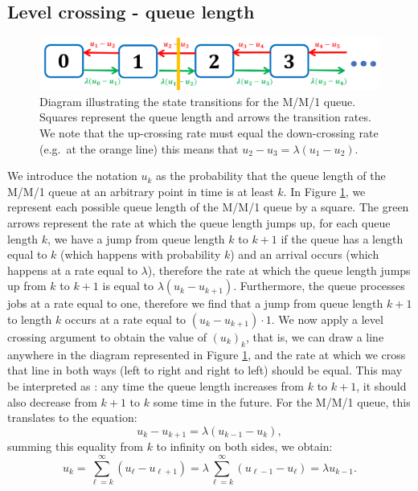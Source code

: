 \documentclass[12pt]{report}
\begin{document}
\begin{appendices}
\section{Level crossing - queue length} \label{sec:MM1_level_cross_QL}
\begin{figure}
\begin{center}
\includegraphics[scale=0.5]{figures/Appendix/MM1_diagram.PNG}
\end{center}
\caption{Diagram illustrating the state transitions for the M/M/1 queue. Squares represent the queue length and arrows the transition rates. We note that the up-crossing rate must equal the down-crossing rate (e.g.~at the orange line) this means that $u_2 - u_3 = \lambda (u_1 - u_2)$.}\label{fig:MM1_diagram}
\end{figure}
We introduce the notation $u_k$ as the probability that the queue length of the M/M/1 queue at an arbitrary point in time is at least $k$. In Figure \ref{fig:MM1_diagram}, we represent each possible queue length of the M/M/1 queue by a square. The green arrows represent the rate at which the queue length jumps up, for each queue length $k$, we have a jump from queue length $k$ to $k+1$ if the queue has a length equal to $k$ (which happens with probability $k$) and an arrival occurs (which happens at a rate equal to $\lambda$), therefore the rate at which the queue length jumps up from $k$ to $k+1$ is equal to $\lambda (u_k - u_{k+1})$. Furthermore, the queue processes jobs at a rate equal to one, therefore we find that a jump from queue length $k+1$ to length $k$ occurs at a rate equal to $(u_k - u_{k+1}) \cdot 1$. We now apply a level crossing argument to obtain the value of $(u_k)_k$, that is, we can draw a line anywhere in the diagram represented in Figure \ref{fig:MM1_diagram}, and the rate at which we cross that line in both ways (left to right and right to left) should be equal. This may be interpreted as : any time the queue length increases from $k$ to $k+1$, it should also decrease from $k+1$ to $k$ some time in the future. For the M/M/1 queue, this translates to the equation:
$$
u_k - u_{k+1} = \lambda (u_{k-1} - u_k),
$$
summing this equality from $k$ to infinity on both sides, we obtain:
$$
u_k = \sum_{\ell = k}^\infty (u_\ell - u_{\ell+1}) = \lambda \sum_{\ell = k}^\infty (u_{\ell-1} - u_\ell) = \lambda u_{k-1}.
$$
\end{appendices}
\end{document}
